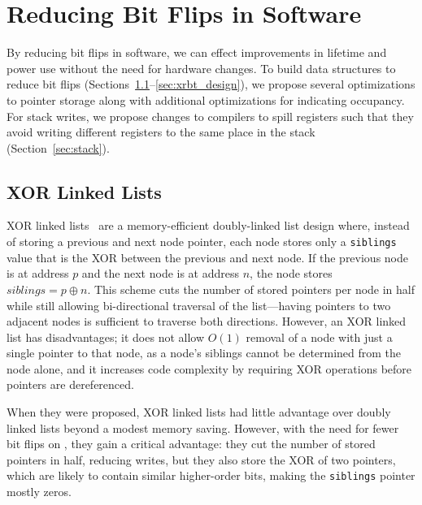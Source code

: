 \section{Reducing Bit Flips in Software}
\label{sec:datastruct}

By reducing bit flips in software, we can effect improvements in \NVM lifetime
and power use without the need for hardware changes.
To build data structures to reduce bit
flips (Sections~\ref{sec:xorll_design}--\ref{sec:xrbt_design}), we propose
several optimizations to pointer storage along with additional optimizations for
indicating occupancy. For stack writes, we propose changes to compilers
to spill registers such that they avoid writing different registers to the same
place in the stack (Section~\ref{sec:stack}).

\subsection{XOR Linked Lists}
\label{sec:xorll_design}

XOR linked lists~\cite{xorll} are a memory-efficient doubly-linked list design
where, instead of storing a previous and next node pointer, each node stores
only a \texttt{siblings} value that is the XOR between the previous and next
node. If the previous node is at address $p$ and the next node is
at address $n$, the node stores $siblings = p \oplus n$. This scheme cuts the
number of stored pointers per node in half while still allowing bi-directional
traversal of the list---having pointers to two adjacent nodes is sufficient to
traverse both directions. However, an XOR linked list has
disadvantages; it does not allow $O(1)$ removal of a node with just a
single pointer to that node, as a node's siblings cannot be determined from the
node alone, and it increases code complexity by requiring XOR operations before
pointers are dereferenced.

When they were proposed, XOR linked lists had little advantage over doubly linked lists beyond
a modest memory saving.
However, with the need for fewer bit flips on \NVM, they gain a critical
advantage: they cut the number of stored pointers in half, reducing writes, but
they also store the XOR of two pointers, which are likely to contain similar
higher-order bits, making the \texttt{siblings} pointer mostly zeros.

